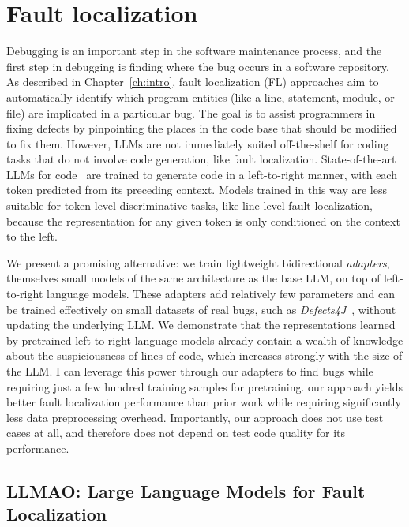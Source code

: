 \documentclass[12pt,openany,oneside,table]{cmuthesis}
\begin{document}
\chapter{Fault localization}
\label{ch:llmao}


Debugging is an important step in the software maintenance process, and the first step in debugging is finding where the bug occurs in a software repository.
As described in Chapter~\ref{ch:intro}, fault localization (FL) approaches aim to automatically identify which program entities (like a line, statement, module, or file) are implicated in a particular bug. The goal is to assist programmers in fixing defects by pinpointing the places in the code base that should be modified to fix them. 
However, LLMs are not immediately suited off-the-shelf for coding tasks that do not involve code generation, like fault localization. State-of-the-art LLMs for code~\cite{chen2021evaluating, black2021gpt, tunstall2022natural, nijkamp2022codegen} are trained to generate code in a left-to-right manner, with each token predicted from its preceding context. 
Models trained in this way are less suitable for token-level discriminative tasks, like line-level fault localization, because the representation for any given token is only conditioned on the context to the left. 

We present a promising alternative: we train lightweight bidirectional \emph{adapters}, themselves small models of the same architecture as the base LLM, on top of left-to-right language models. These adapters add relatively few parameters and can be trained effectively on small datasets of real bugs, such as \textit{Defects4J}~\cite{just2014defects4j}, without updating the underlying LLM. We demonstrate that the representations learned by pretrained left-to-right language models already contain a wealth of knowledge about the suspiciousness of lines of code, which increases strongly with the size of the LLM.  I can leverage this power through our adapters to find bugs while requiring just a few hundred training samples for pretraining. 
our approach yields better fault localization performance than prior work while requiring significantly less data preprocessing overhead. Importantly, our approach does not use test cases at all, and therefore does not depend on test code quality for its performance. 

\section{LLMAO: Large Language Models for Fault Localization}
\label{sec:LLMAO}
\end{document}
